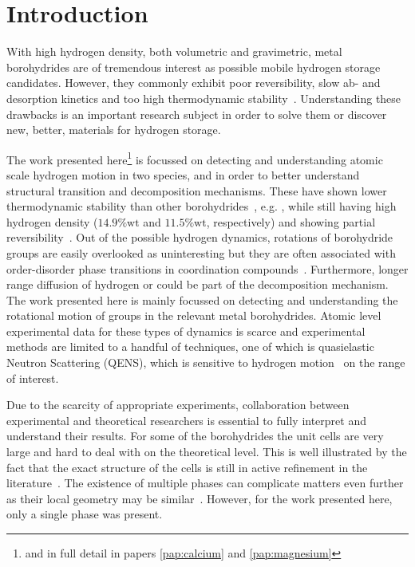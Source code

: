 \section{Introduction}
\label{sec:borohydrides-introduction}
With high hydrogen density, both volumetric and gravimetric, metal borohydrides are of tremendous interest as possible mobile hydrogen storage candidates.
However, they commonly exhibit poor reversibility, slow ab- and desorption kinetics and too high thermodynamic stability~\cite{lithium-stability-2003, borohydride-stability-2006, calcium-stability-2006}.
Understanding these drawbacks is an important research subject in order to solve them or discover new, better, materials for hydrogen storage.

The work presented here\footnote{and in full detail in papers \ref{pap:calcium} and \ref{pap:magnesium}} is focussed on detecting and understanding atomic scale hydrogen motion in two species,  and  in order to better understand structural transition and decomposition mechanisms.
These have shown lower thermodynamic stability than other borohydrides~\cite{borohydride-stability-2006, calcium-stability-2006}, e.g. , while still having high hydrogen density ($14.9\%\text{wt}$ and $11.5\%\text{wt}$, respectively) and showing partial reversibility~\cite{magnesium-reversibility-severa-2010, magnesium-reversibility-chong-2011, calcium-reversibility-2007, calcium-reversibility-2008, reversibility-destabilisation-2008}.
Out of the possible hydrogen dynamics, rotations of borohydride groups are easily overlooked as uninteresting but they are often associated with order-disorder phase transitions in coordination compounds~\cite{order-disorder-2010, order-disorder-2006}.
Furthermore, longer range diffusion of hydrogen or  could be part of the decomposition mechanism.
The work presented here is mainly focussed on detecting and understanding the rotational motion of  groups in the relevant metal borohydrides.
Atomic level experimental data for these types of dynamics is scarce and experimental methods are limited to a handful of techniques, one of which is quasielastic Neutron Scattering (QENS), which is sensitive to hydrogen motion~\cite{qens-bee-1988} on the range of interest.

Due to the scarcity of appropriate experiments, collaboration between experimental and theoretical researchers is essential to fully interpret and understand their results.
For some of the borohydrides the unit cells are very large and hard to deal with on the theoretical level.
This is well illustrated by the fact that the exact structure of the cells is still in active refinement in the literature~\cite{cabh42-structure-p42m, cabh42-structure-p4}.
The existence of multiple phases can complicate matters even further as their local geometry may be similar~\cite{mgbh42-structure-fddd, mgbh42-phases-2007, mgbh42-phases-2008, mgbh42-phases-2009}.
However, for the work presented here, only a single phase was present.

